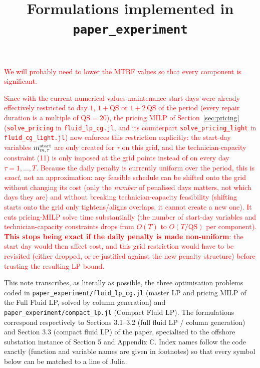 \documentclass[11pt]{article}
\title{Formulations implemented in \texttt{paper\_experiment}}
\author{}
\date{}
\begin{document}
\maketitle

\noindent
\textcolor{red}{We will probably need to lower the MTBF values so that every component is
significant.}

\noindent
\textcolor{red}{Since with the current numerical values maintenance start days were
already effectively restricted to day $1$, $1+\mathrm{QS}$ or $1+2\,\mathrm{QS}$ of the
period (every repair duration is a multiple of $\mathrm{QS} = 20$), the pricing MILP of
Section~\ref{sec:pricing} (\texttt{solve\_pricing} in \texttt{fluid\_lp\_cg.jl}, and its
counterpart \texttt{solve\_pricing\_light} in \texttt{fluid\_cg\_light.jl}) now enforces
this restriction explicitly: the start-day variables $m^{\rm start}_{m,\tau}$ are only
created for $\tau$ on this grid, and the technician-capacity constraint (11) is only
imposed at the grid points instead of on every day $\tau=1,\dots,T$. Because the daily
penalty is currently uniform over the period, this is \emph{exact}, not an approximation:
any feasible schedule can be shifted onto the grid without changing its cost (only the
\emph{number} of penalised days matters, not which days they are) and without breaking
technician-capacity feasibility (shifting starts onto the grid only tightens/aligns
overlaps, it cannot create a new one). It cuts pricing-MILP solve time substantially (the
number of start-day
variables and technician-capacity constraints drops from $O(T)$ to $O(T/\mathrm{QS})$
per component). \textbf{This stops being exact if the daily penalty is made
non-uniform}: the start day would then affect cost, and this grid restriction would
have to be revisited (either dropped, or re-justified against the new penalty
structure) before trusting the resulting LP bound.}

\noindent
This note transcribes, as literally as possible, the three optimisation problems coded in
\texttt{paper\_experiment/fluid\_lp\_cg.jl} (master LP and pricing MILP of the Full Fluid LP,
solved by column generation) and \texttt{paper\_experiment/compact\_lp.jl} (Compact Fluid LP).
The formulations correspond respectively to Sections 3.1--3.2 (full fluid LP / column
generation) and Section 3.3 (compact fluid LP) of the paper, specialised to the offshore
substation instance of Section 5 and Appendix C. Index names follow the code exactly
(function and variable names are given in footnotes) so that every symbol below can be
matched to a line of Julia.
\end{document}
